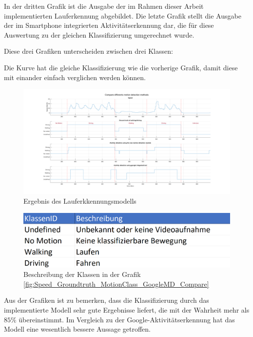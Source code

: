 In der dritten Grafik ist die Ausgabe der im Rahmen dieser Arbeit implementierten Lauferkennung abgebildet. 
Die letzte Grafik stellt die Ausgabe der im Smartphone integrierten Aktivitätserkennung dar, die für diese Auswertung zu der gleichen Klassifizierung umgerechnet wurde.

Diese drei Grafiken unterscheiden zwischen drei Klassen:

Die Kurve hat die gleiche Klassifizierung wie die vorherige Grafik, damit diese mit einander einfach verglichen werden können.


\begin{figure}[H]
	\centering
	\includegraphics[width=\linewidth]{Bilder/Speed_Groundtruth_MotionClass_GoogleMD_Compare.png}
	\caption{Ergebnis des Lauferkkennungsmodells}
	\label{fig:Speed_Groundtruth_MotionClass_GoogleMD_Compare}
\end{figure}

\begin{figure}[H]
	\centering
	\includegraphics[width=0.6\linewidth]{Bilder/Lauferkennung_Klassentabelle.png}
	\caption{Beschreibung der Klassen in der Grafik \autoref{fig:Speed_Groundtruth_MotionClass_GoogleMD_Compare}}
	\label{fig:Lauferkennung_Klassentabelle}
\end{figure}

Aus der Grafiken ist zu bemerken, dass die Klassifizierung durch das implementierte Modell sehr gute Ergebnisse liefert, die mit der Wahrheit mehr als $85\%$ übereinstimmt. Im Vergleich zu der Google-Aktivitätserkennung hat das Modell eine wesentlich bessere Aussage getroffen.



